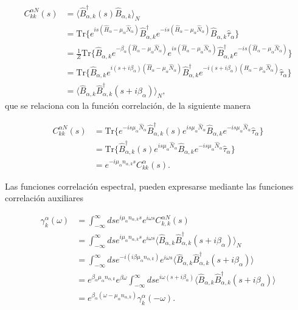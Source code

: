 \begin{appendixs}
\begin{align*}
    C^{\alpha N}_{kk}(s) & =  \langle \hat{B}^{\dagger}_{\alpha,k}(s)\hat{B}_{\alpha,k} \rangle_{N} \\
   &  = \text{Tr}\{e^{is(\hat{H}_{\alpha} - \mu_{\alpha}\hat{N}_{\alpha})}\hat{B}^{\dagger}_{\alpha,k}e^{-is(\hat{H}_{\alpha} - \mu_{\alpha}\hat{N}_{\alpha})}\hat{B}_{\alpha,k}\hat{\tau}_{\alpha}  \} \\
   & = \frac{1}{Z}\text{Tr}\{\hat{B}_{\alpha,k} e^{-\beta_{\alpha}(\hat{H}_{\alpha} - \mu_{\alpha}\hat{N}_{\alpha})} e^{is(\hat{H}_{\alpha} - \mu_{\alpha}\hat{N}_{\alpha})}\hat{B}^{\dagger}_{\alpha,k}e^{-is(\hat{H}_{\alpha} - \mu_{\alpha}\hat{N}_{\alpha})}\} \\
   & = \text{Tr}\{\hat{B}_{\alpha,k}e^{i(s+i\beta_{\alpha})(\hat{H}_{\alpha} - \mu_{\alpha}\hat{N}_{\alpha})}\hat{B}^{\dagger}_{\alpha,k}e^{-i(s+i\beta_{\alpha})(\hat{H}_{\alpha} - \mu_{\alpha}\hat{N}_{\alpha})}\hat{\tau}_{\alpha} \} \\
   & = \langle \hat{B}_{\alpha,k} \hat{B}^{\dagger}_{\alpha,k}(s+i\beta_{\alpha})\rangle_{N},
\end{align*}
que se relaciona con la función correlación, de la siguiente manera 

\begin{align*}
    C^{\alpha N}_{kk}(s) & = \text{Tr}\{e^{-is\mu_{\alpha}\hat{N}_{\alpha} }\hat{B}^{\dagger}_{\alpha,k}(s)e^{is\mu_{\alpha}\hat{N}_{\alpha}} \hat{B}_{\alpha,k}e^{-is\mu_{\alpha}\hat{N}_{\alpha} }\hat{\tau}_{\alpha}   \} \\
 & = \text{Tr}\{\hat{B}^{\dagger}_{\alpha,k}(s)e^{is\mu_{\alpha}\hat{N}_{\alpha}} \hat{B}_{\alpha,k}e^{-is\mu_{\alpha}\hat{N}_{\alpha}}\hat{\tau}_{\alpha}   \}\\
 & = e^{-i\mu_{\alpha}n_{\alpha,k}s} C^{\alpha}_{kk}(s).
\end{align*}

Las funciones correlación espectral, pueden expresarse mediante las funciones correlación auxiliares

\begin{align*}
    \gamma^{\alpha}_{k}(\omega) & = \int_{-\infty}^{\infty}ds e^{i\mu_{\alpha}n_{\alpha,k}s} e^{i\omega s}C^{\alpha N}_{k,k}(s) \\
    & = \int_{-\infty}^{\infty}ds e^{i\mu_{\alpha}n_{\alpha,k}s} e^{i\omega s}\langle \hat{B}_{\alpha,k} \hat{B}^{\dagger}_{\alpha,k}(s+i\beta_{\alpha}) \rangle_{N} \\
    & = \int_{-\infty}^{\infty}ds e^{-i(i\beta \mu_{\alpha}n_{\alpha,k})} e^{i\omega s} \langle \hat{B}_{\alpha,k}\hat{B}^{\dagger}_{\alpha,k}(s+i\beta_{\alpha}) \rangle \\
    & = e^{\beta_{\alpha}\mu_{\alpha}n_{\alpha,k}}e^{\beta \omega} \int_{-\infty}^{\infty} ds e^{i\omega(s+i\beta_{\alpha})} \langle \hat{B}_{\alpha,k}\hat{B}^{\dagger}_{\alpha,k}(s+i\beta_{\alpha}) \rangle \\
    & = e^{\beta_{\alpha}(\omega - \mu_{\alpha}n_{\alpha,k})} \gamma^{\alpha}_{k}(-\omega).
\end{align*}



\end{appendixs}
